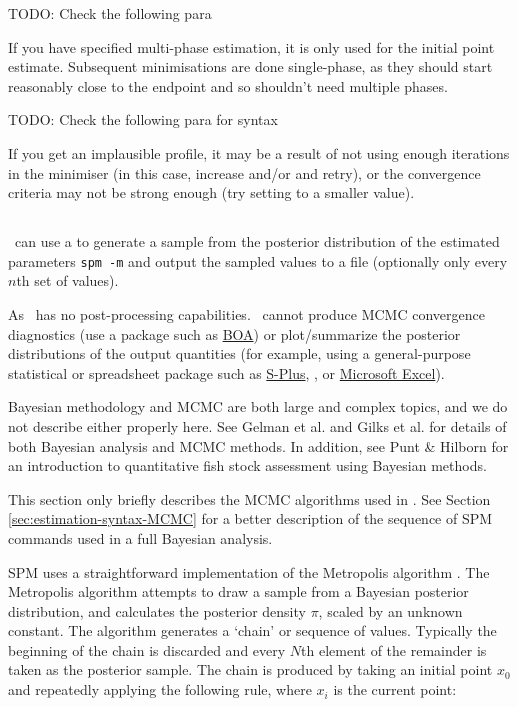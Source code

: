 TODO: Check the following para

If you have specified multi-phase estimation, it is only used for the initial point estimate. Subsequent minimisations are done single-phase, as they should start reasonably close to the endpoint and so shouldn't need multiple phases.

TODO: Check the following para for syntax

If you get an implausible profile, it may be a result of not using enough iterations in the minimiser (in this case, increase  and/or  and retry), or the convergence criteria may not be strong enough (try setting  to a smaller value).

\subsection{\label{sec:estimate-MCMC}}

\SPM\ can use a  to generate a sample from the posterior distribution of the estimated parameters \texttt{spm -m} and output the sampled values to a file (optionally only every $n$th set of values).

As \SPM\ has no post-processing capabilities. \SPM\ cannot produce MCMC convergence diagnostics (use a package such as \href{http://www.public-health.uiowa.edu/boa}{BOA}) or plot/summarize the posterior distributions of the output quantities (for example, using a general-purpose statistical or spreadsheet package such as \href{http://www.insightful.com}{S-Plus}, \href{http://www.r-project.org}{\R}, or \href{http://www.microsoft.com}{Microsoft Excel}).

Bayesian methodology and MCMC are both large and complex topics, and we do not describe either properly here. See Gelman et al. \citeyearpar{823} and Gilks et al. \citeyearpar{143} for details of both Bayesian analysis and MCMC methods. In addition, see Punt \& Hilborn \citeyearpar{828} for an introduction to quantitative fish stock assessment using Bayesian methods. 

This section only briefly describes the MCMC algorithms used in \SPM. See Section \ref{sec:estimation-syntax-MCMC} for a better description of the sequence of SPM commands used in a full Bayesian analysis.

SPM uses a straightforward implementation of the Metropolis algorithm \citep{823,143}. The Metropolis algorithm attempts to draw a sample from a Bayesian posterior distribution, and calculates the posterior density $\pi$, scaled by an unknown constant. The algorithm generates a `chain' or sequence of values. Typically the beginning of the chain is discarded and every $N$th element of the remainder is taken as the posterior sample. The chain is produced by taking an initial point $x_0$ and repeatedly applying the following rule, where $x_i$ is the current point: 


